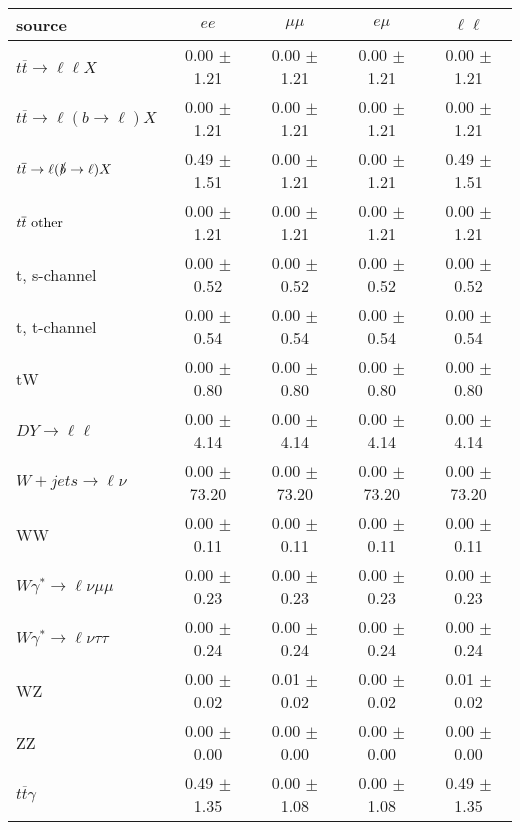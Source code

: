\begin{tabular}{l|cccc} \hline\hline
source & $ee$ & $\mu\mu$ & $e\mu$ & $\ell\ell $ \\
\hline
$t\overline{t} \rightarrow \ell \ell X$ &  0.00 $\pm$  1.21 &  0.00 $\pm$  1.21 &  0.00 $\pm$  1.21 &  0.00 $\pm$  1.21 \\
$t\overline{t} \rightarrow \ell (b \rightarrow \ell) X$ &  0.00 $\pm$  1.21 &  0.00 $\pm$  1.21 &  0.00 $\pm$  1.21 &  0.00 $\pm$  1.21 \\
$t\overline{t} \rightarrow \ell (\slashed b \rightarrow \ell) X$ &  0.49 $\pm$  1.51 &  0.00 $\pm$  1.21 &  0.00 $\pm$  1.21 &  0.49 $\pm$  1.51 \\
        $t\overline{t}\ \rm{other}$ &  0.00 $\pm$  1.21 &  0.00 $\pm$  1.21 &  0.00 $\pm$  1.21 &  0.00 $\pm$  1.21 \\
\hline
                       t, s-channel &  0.00 $\pm$  0.52 &  0.00 $\pm$  0.52 &  0.00 $\pm$  0.52 &  0.00 $\pm$  0.52 \\
                       t, t-channel &  0.00 $\pm$  0.54 &  0.00 $\pm$  0.54 &  0.00 $\pm$  0.54 &  0.00 $\pm$  0.54 \\
                                 tW &  0.00 $\pm$  0.80 &  0.00 $\pm$  0.80 &  0.00 $\pm$  0.80 &  0.00 $\pm$  0.80 \\
\hline
         $DY \rightarrow \ell \ell$ &  0.00 $\pm$  4.14 &  0.00 $\pm$  4.14 &  0.00 $\pm$  4.14 &  0.00 $\pm$  4.14 \\
      $W+jets \rightarrow \ell \nu$ &  0.00 $\pm$ 73.20 &  0.00 $\pm$ 73.20 &  0.00 $\pm$ 73.20 &  0.00 $\pm$ 73.20 \\
                                 WW &  0.00 $\pm$  0.11 &  0.00 $\pm$  0.11 &  0.00 $\pm$  0.11 &  0.00 $\pm$  0.11 \\
\hline
$W\gamma^{*} \rightarrow \ell \nu \mu\mu$ &  0.00 $\pm$  0.23 &  0.00 $\pm$  0.23 &  0.00 $\pm$  0.23 &  0.00 $\pm$  0.23 \\
$W\gamma^{*} \rightarrow \ell \nu \tau\tau$ &  0.00 $\pm$  0.24 &  0.00 $\pm$  0.24 &  0.00 $\pm$  0.24 &  0.00 $\pm$  0.24 \\
                                 WZ &  0.00 $\pm$  0.02 &  0.01 $\pm$  0.02 &  0.00 $\pm$  0.02 &  0.01 $\pm$  0.02 \\
                                 ZZ &  0.00 $\pm$  0.00 &  0.00 $\pm$  0.00 &  0.00 $\pm$  0.00 &  0.00 $\pm$  0.00 \\
\hline
              $t\overline{t}\gamma$ &  0.49 $\pm$  1.35 &  0.00 $\pm$  1.08 &  0.00 $\pm$  1.08 &  0.49 $\pm$  1.35 \\

\end{tabular}
